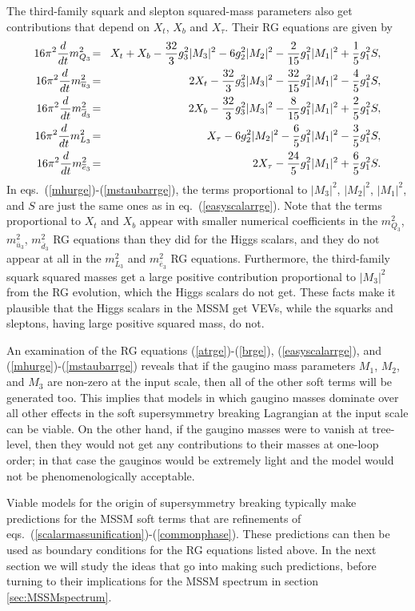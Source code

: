 \documentclass[11pt]{article}
\def\beq{\begin{eqnarray}}
\def\eeq{\end{eqnarray}}
\def\sbar{\overline}
\begin{document}
The third-family squark and slepton squared-mass parameters also get
contributions that depend on $X_t$, $X_b$ and $X_\tau$. Their RG equations
are given by
\beq 
16\pi^2{d\over dt} m_{Q_3}^2 \!&=&\!
X_t +X_b-{32\over 3} g_3^2 |M_3|^2 -6 g_2^2 |M_2|^2 -{2\over 15} g_1^2 |M_1|^2
+ \frac{1}{5} g^{2}_1 S ,
\label{mq3rge} 
\\
16\pi^2 {d\over dt} m_{\sbar u_3}^2 \!&=&\!
2 X_t - {32\over 3} g_3^2 |M_3|^2 - {32\over 15} g_1^2|M_1|^2
- \frac{4}{5} g^{2}_1 S ,
\label{mtbarrge}
\\
16\pi^2 {d\over dt} m_{\sbar d_3}^2 \!&=&\!
2 X_b - {32\over 3} g_3^2 |M_3|^2 - {8\over 15} g_1^2|M_1|^2 
+ \frac{2}{5} g^{2}_1 S ,
\label{md3rge}
\\
16\pi^2 {d\over dt} m_{L_3}^2 \!&=&\!
X_\tau  - 6 g_2^2 |M_2|^2 - {6\over 5} g_1^2 |M_1|^2 - \frac{3}{5} g^{2}_1 S,
\\
16\pi^2 {d\over dt} m_{\sbar e_3}^2 \!&=&\!
2 X_\tau - {24\over 5} g_1^2 |M_1|^2  + \frac{6}{5} g^{2}_1 S .
\label{mstaubarrge}
\eeq
In eqs.~(\ref{mhurge})-(\ref{mstaubarrge}), the terms proportional to
$|M_3|^2$, $|M_2|^2$, $|M_1|^2$, and $S$ are just the same ones as in
eq.~(\ref{easyscalarrge}). Note that the terms proportional to $X_t$ and
$X_b$ appear with smaller numerical coefficients in the $m^2_{Q_3}$,
$m^2_{\sbar u_3}$, $m^2_{\sbar d_3}$ RG equations than they did for the
Higgs scalars, and they do not appear at all in the $m^2_{L_3}$ and
$m^2_{\sbar e_3}$ RG equations. Furthermore, the third-family squark
squared masses get a large positive contribution proportional to $|M_3|^2$
from the RG evolution, which the Higgs scalars do not get. These facts
make it plausible that the Higgs scalars in the MSSM get VEVs, while the
squarks and sleptons, having large positive squared mass, do not. 

An examination of the RG equations (\ref{atrge})-(\ref{brge}),
(\ref{easyscalarrge}), and (\ref{mhurge})-(\ref{mstaubarrge}) reveals that
if the gaugino mass parameters $M_1$, $M_2$, and $M_3$ are non-zero at the
input scale, then all of the other soft terms will be generated too.  This
implies that models in which gaugino masses dominate over all other
effects in the soft supersymmetry breaking Lagrangian at the input scale
can be viable. On the other hand, if the gaugino masses were to vanish at
tree-level, then they would not get any contributions to their masses at
one-loop order; in that case the gauginos would be extremely light and the
model would not be phenomenologically acceptable. 

Viable models for the origin of supersymmetry breaking typically make
predictions for the MSSM soft terms that are refinements of
eqs.~(\ref{scalarmassunification})-(\ref{commonphase}). These predictions
can then be used as boundary conditions for the RG equations listed above. 
In the next section we will study the ideas that go into making such
predictions, before turning to their implications for the MSSM spectrum in
section \ref{sec:MSSMspectrum}. 
\end{document}

